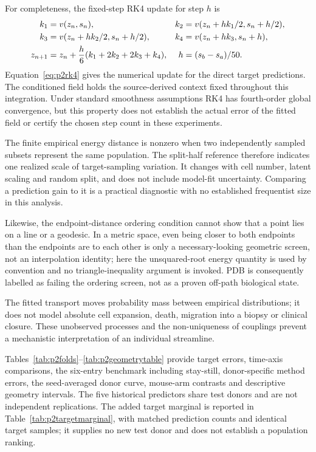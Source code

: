 For completeness, the fixed-step RK4 update for step $h$ is
\begin{align}
k_1&=v(z_n,s_n),& k_2&=v(z_n+hk_1/2,s_n+h/2),\notag\\
k_3&=v(z_n+hk_2/2,s_n+h/2),& k_4&=v(z_n+hk_3,s_n+h),\notag\\
z_{n+1}&=z_n+\frac h6(k_1+2k_2+2k_3+k_4),&h&=(s_b-s_a)/50.\label{eq:p2rk4}
\end{align}
Equation~\eqref{eq:p2rk4} gives the numerical update for the direct target predictions. The conditioned field holds the source-derived context fixed throughout this integration. Under standard smoothness assumptions RK4 has fourth-order global convergence, but this property does not establish the actual error of the fitted field or certify the chosen step count in these experiments.

The finite empirical energy distance is nonzero when two independently sampled subsets represent the same population. The split-half reference therefore indicates one realized scale of target-sampling variation. It changes with cell number, latent scaling and random split, and does not include model-fit uncertainty. Comparing a prediction gain to it is a practical diagnostic with no established frequentist size in this analysis.

Likewise, the endpoint-distance ordering condition cannot show that a point lies on a line or a geodesic. In a metric space, even being closer to both endpoints than the endpoints are to each other is only a necessary-looking geometric screen, not an interpolation identity; here the unsquared-root energy quantity is used by convention and no triangle-inequality argument is invoked. PDB is consequently labelled as failing the ordering screen, not as a proven off-path biological state.

The fitted transport moves probability mass between empirical distributions; it does not model absolute cell expansion, death, migration into a biopsy or clinical closure. These unobserved processes and the non-uniqueness of couplings prevent a mechanistic interpretation of an individual streamline.

Tables~\ref{tab:p2folds}--\ref{tab:p2geometrytable} provide target errors, time-axis comparisons, the six-entry benchmark including stay-still, donor-specific method errors, the seed-averaged donor curve, mouse-arm contrasts and descriptive geometry intervals. The five historical predictors share test donors and are not independent replications. The added target marginal is reported in Table~\ref{tab:p2targetmarginal}, with matched prediction counts and identical target samples; it supplies no new test donor and does not establish a population ranking.

